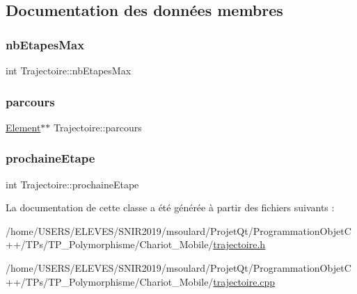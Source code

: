 \subsection{Documentation des données membres}
\mbox{\label{class_trajectoire_a62cc9d5c52215094c7f0731e07cccbf5}} 
\subsubsection{\texorpdfstring{nb\+Etapes\+Max}{nbEtapesMax}}
{\footnotesize\ttfamily int Trajectoire\+::nb\+Etapes\+Max\hspace{0.3cm}{\ttfamily [private]}}

\mbox{\label{class_trajectoire_a526de5df82ef3ae78757ecb441d4179e}} 
\subsubsection{\texorpdfstring{parcours}{parcours}}
{\footnotesize\ttfamily \hyperlink{class_element}{Element}$\ast$$\ast$ Trajectoire\+::parcours\hspace{0.3cm}{\ttfamily [private]}}

\mbox{\label{class_trajectoire_a56fb38e337100dcbc3c49727d8f68c6a}} 
\subsubsection{\texorpdfstring{prochaine\+Etape}{prochaineEtape}}
{\footnotesize\ttfamily int Trajectoire\+::prochaine\+Etape\hspace{0.3cm}{\ttfamily [private]}}



La documentation de cette classe a été générée à partir des fichiers suivants \+:\begin{DoxyCompactItemize}
\item 
/home/\+U\+S\+E\+R\+S/\+E\+L\+E\+V\+E\+S/\+S\+N\+I\+R2019/msoulard/\+Projet\+Qt/\+Programmation\+Objet\+C++/\+T\+Ps/\+T\+P\+\_\+\+Polymorphisme/\+Chariot\+\_\+\+Mobile/\hyperlink{trajectoire_8h}{trajectoire.\+h}\item 
/home/\+U\+S\+E\+R\+S/\+E\+L\+E\+V\+E\+S/\+S\+N\+I\+R2019/msoulard/\+Projet\+Qt/\+Programmation\+Objet\+C++/\+T\+Ps/\+T\+P\+\_\+\+Polymorphisme/\+Chariot\+\_\+\+Mobile/\hyperlink{trajectoire_8cpp}{trajectoire.\+cpp}\end{DoxyCompactItemize}
